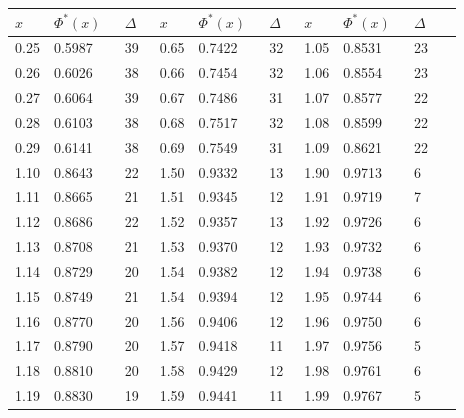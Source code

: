 \documentclass[russian, 12pt, fleqn]{article}
\begin{document}
\begin{center}
\begin{tabular}[b]{ | l | l | l || l | l | l || l | l | l | l |   }
\hline
$x\ \ \ \ \ $&$\Phi^*(x)\ \ \ $&$\Delta\ \ \ $&$x\ \ \ \ \ $&$\Phi^*(x)\ \ \ $&$\Delta\ \ \ $&$x\ \ \ \ \ $&$\Phi^*(x)\ \ \ $&$\Delta\ \ \ $\\
\hline
0.25&0.5987&39&0.65&0.7422&32&1.05&0.8531&23\\%
0.26&0.6026&38&0.66&0.7454&32&1.06&0.8554&23\\%
0.27&0.6064&39&0.67&0.7486&31&1.07&0.8577&22\\%
0.28&0.6103&38&0.68&0.7517&32&1.08&0.8599&22\\%
0.29&0.6141&38&0.69&0.7549&31&1.09&0.8621&22\\%
\hline
1.10&0.8643&22&1.50&0.9332&13&1.90&0.9713&6\\%
1.11&0.8665&21&1.51&0.9345&12&1.91&0.9719&7\\%
1.12&0.8686&22&1.52&0.9357&13&1.92&0.9726&6\\%
1.13&0.8708&21&1.53&0.9370&12&1.93&0.9732&6\\%
1.14&0.8729&20&1.54&0.9382&12&1.94&0.9738&6\\%
 
1.15&0.8749&21&1.54&0.9394&12&1.95&0.9744&6\\%
1.16&0.8770&20&1.56&0.9406&12&1.96&0.9750&6\\%
1.17&0.8790&20&1.57&0.9418&11&1.97&0.9756&5\\%
1.18&0.8810&20&1.58&0.9429&12&1.98&0.9761&6\\%
1.19&0.8830&19&1.59&0.9441&11&1.99&0.9767&5\\%
\hline
\end{tabular}\\
\end{center}
\newpage
\end{document}
